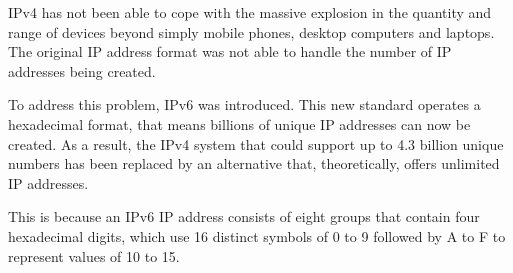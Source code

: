IPv4 has not been able to cope with the massive explosion in the quantity and range of devices beyond simply mobile phones, desktop computers and laptops. The original IP address format was not able to handle the number of IP addresses being created.

To address this problem, IPv6 was introduced. This new standard operates a hexadecimal format, that means billions of unique IP addresses can now be created. As a result, the IPv4 system that could support up to 4.3 billion unique numbers has been replaced by an alternative that, theoretically, offers unlimited IP addresses.

This is because an IPv6 IP address consists of eight groups that contain four hexadecimal digits, which use 16 distinct symbols of 0 to 9 followed by A to F to represent values of 10 to 15.

